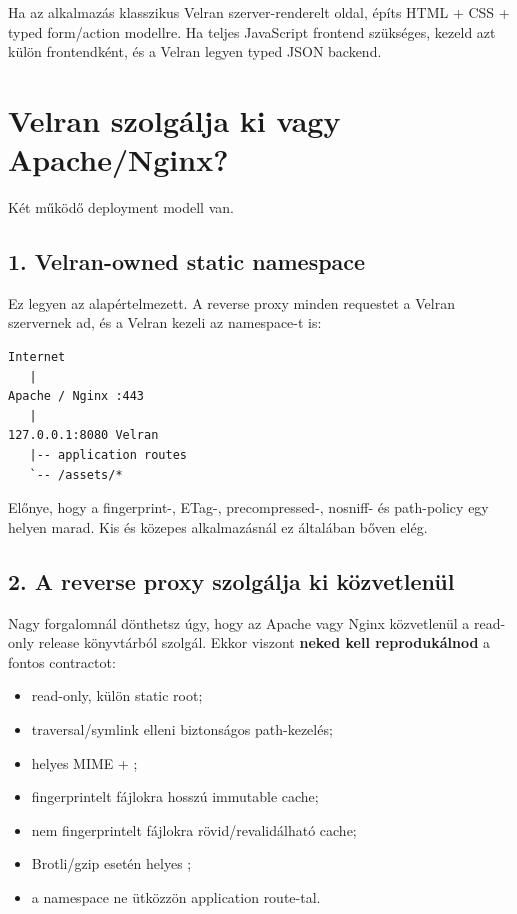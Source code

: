 Ha az alkalmazás klasszikus Velran szerver-renderelt oldal, építs HTML + CSS + typed form/action modellre. Ha teljes JavaScript frontend szükséges, kezeld azt külön frontendként, és a Velran legyen typed JSON backend.

\section{Velran szolgálja ki vagy Apache/Nginx?}

Két működő deployment modell van.

\subsection*{1. Velran-owned static namespace}

Ez legyen az alapértelmezett. A reverse proxy minden requestet a Velran szervernek ad, és a Velran kezeli az  namespace-t is:

\begin{lstlisting}
Internet
   |
Apache / Nginx :443
   |
127.0.0.1:8080 Velran
   |-- application routes
   `-- /assets/*
\end{lstlisting}

Előnye, hogy a fingerprint-, ETag-, precompressed-, nosniff- és path-policy egy helyen marad. Kis és közepes alkalmazásnál ez általában bőven elég.

\subsection*{2. A reverse proxy szolgálja ki közvetlenül}

Nagy forgalomnál dönthetsz úgy, hogy az Apache vagy Nginx közvetlenül a read-only release  könyvtárból szolgál. Ekkor viszont \textbf{neked kell reprodukálnod} a fontos contractot:

\begin{itemize}
  \item read-only, külön static root;
  \item traversal/symlink elleni biztonságos path-kezelés;
  \item helyes MIME + ;
  \item fingerprintelt fájlokra hosszú immutable cache;
  \item nem fingerprintelt fájlokra rövid/revalidálható cache;
  \item Brotli/gzip esetén helyes ;
  \item a namespace ne ütközzön application route-tal.
\end{itemize}

